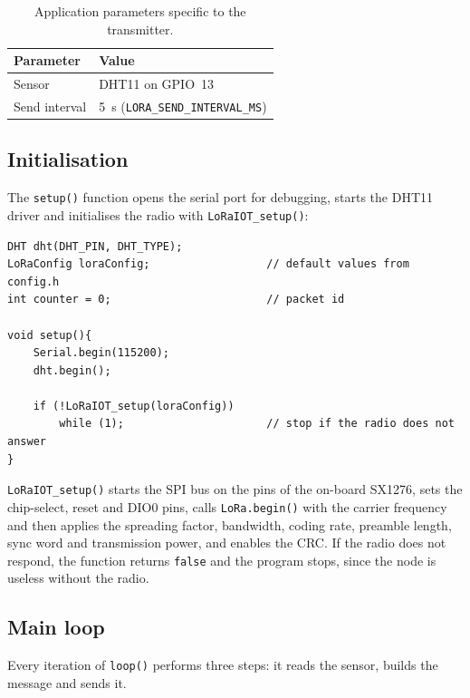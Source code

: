 \documentclass[informe,english]{plantilla}
\begin{document}
\begin{table}[h]
    \centering
    \begin{tabular}{@{}ll@{}}
        \toprule
        \textbf{Parameter}        & \textbf{Value} \\
        \midrule
        Sensor                    & DHT11 on GPIO~13 \\
        Send interval             & 5~s (\texttt{LORA\_SEND\_INTERVAL\_MS}) \\
        \bottomrule
    \end{tabular}
    \caption{Application parameters specific to the transmitter.}
    \label{tab:lora-config}
\end{table}

\subsection{Initialisation}

The \texttt{setup()} function opens the serial port for debugging, starts the
DHT11 driver and initialises the radio with \texttt{LoRaIOT\_setup()}:

\begin{lstlisting}[style=arduino, caption={Initialisation of the transmitter.}]
DHT dht(DHT_PIN, DHT_TYPE);
LoRaConfig loraConfig;                  // default values from config.h
int counter = 0;                        // packet id

void setup(){
    Serial.begin(115200);
    dht.begin();

    if (!LoRaIOT_setup(loraConfig))
        while (1);                      // stop if the radio does not answer
}
\end{lstlisting}

\texttt{LoRaIOT\_setup()} starts the SPI bus on the pins of the on-board SX1276, sets the chip-select, reset and DIO0 pins, calls
\texttt{LoRa.begin()} with the carrier frequency and then applies the spreading factor, bandwidth, coding rate, preamble length, sync word and transmission power, and enables the CRC. If the radio does not respond, the function returns \texttt{false} and the program stops, since the node is useless without the radio.

\subsection{Main loop}

Every iteration of \texttt{loop()} performs three steps: it reads the sensor, builds the message and sends it.
\end{document}
